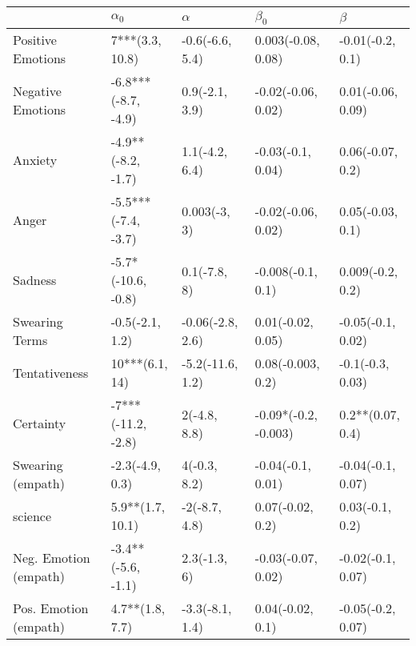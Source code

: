 \begin{tabular}{lllll}
\toprule
{} &           $\alpha_0$ &          $\alpha$ &             $\beta_0$ &            $\beta$ \\
\midrule
Positive Emotions     &      7***(3.3, 10.8) &   -0.6(-6.6, 5.4) &    0.003(-0.08, 0.08) &   -0.01(-0.2, 0.1) \\
Negative Emotions     &  -6.8***(-8.7, -4.9) &    0.9(-2.1, 3.9) &    -0.02(-0.06, 0.02) &  0.01(-0.06, 0.09) \\
Anxiety               &   -4.9**(-8.2, -1.7) &    1.1(-4.2, 6.4) &     -0.03(-0.1, 0.04) &   0.06(-0.07, 0.2) \\
Anger                 &  -5.5***(-7.4, -3.7) &      0.003(-3, 3) &    -0.02(-0.06, 0.02) &   0.05(-0.03, 0.1) \\
Sadness               &   -5.7*(-10.6, -0.8) &      0.1(-7.8, 8) &     -0.008(-0.1, 0.1) &   0.009(-0.2, 0.2) \\
Swearing Terms        &      -0.5(-2.1, 1.2) &  -0.06(-2.8, 2.6) &     0.01(-0.02, 0.05) &  -0.05(-0.1, 0.02) \\
Tentativeness         &       10***(6.1, 14) &  -5.2(-11.6, 1.2) &     0.08(-0.003, 0.2) &   -0.1(-0.3, 0.03) \\
Certainty             &   -7***(-11.2, -2.8) &      2(-4.8, 8.8) &  -0.09*(-0.2, -0.003) &   0.2**(0.07, 0.4) \\
Swearing (empath)     &      -2.3(-4.9, 0.3) &      4(-0.3, 8.2) &     -0.04(-0.1, 0.01) &  -0.04(-0.1, 0.07) \\
science               &     5.9**(1.7, 10.1) &     -2(-8.7, 4.8) &      0.07(-0.02, 0.2) &    0.03(-0.1, 0.2) \\
Neg. Emotion (empath) &   -3.4**(-5.6, -1.1) &      2.3(-1.3, 6) &    -0.03(-0.07, 0.02) &  -0.02(-0.1, 0.07) \\
Pos. Emotion (empath) &      4.7**(1.8, 7.7) &   -3.3(-8.1, 1.4) &      0.04(-0.02, 0.1) &  -0.05(-0.2, 0.07) \\
\bottomrule
\end{tabular}
